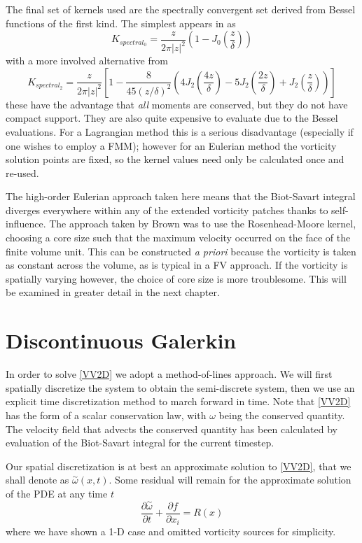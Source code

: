 \documentclass[letterpaper,12pt]{report}
\newcommand{\ben}[1]{\begin{equation}\label{#1}}
\newcommand{\ee}{\end{equation}}
\newcommand{\aomega}{\overset{\sim}{\omega}}				%
\begin{document}
The final set of kernels used are the spectrally convergent set derived from Bessel functions of the first kind. The simplest appears in \cite{WL} as
\ben{PSkern}  K_{spectral_0}= \frac{z}{2 \pi |z|^2} (1-J_0(\frac{z}{\delta})) \ee
with a more involved alternative from \cite{HaldReview}
\ben{PSkern}  K_{spectral_2}= \frac{z}{2 \pi |z|^2} \left[1-\frac{8}{45(z/\delta)^2}(4J_2(\frac{4z}{\delta})-5J_2(\frac{2z}{\delta})+J_2(\frac{z}{\delta}))\right] \ee
these have the advantage that \textit{all} moments are conserved, but they do not have compact support. They are also quite expensive to evaluate due to the Bessel evaluations. For a Lagrangian method this is a serious disadvantage (especially if one wishes to employ a FMM); however for an Eulerian method the vorticity solution points are fixed, so the kernel values need only be calculated once and re-used.

The high-order Eulerian approach taken here means that the Biot-Savart integral diverges everywhere within any of the extended vorticity patches thanks to self-influence. The approach taken by Brown \cite{Brown2004} was to use the Rosenhead-Moore kernel, choosing a core size such that the maximum velocity occurred on the face of the finite volume unit. This can be constructed \textit{a priori} because the vorticity is taken as constant across the volume, as is typical in a FV approach. If the vorticity is spatially varying however, the choice of core size is more troublesome. This will be examined in greater detail in the next chapter.

\section{Discontinuous Galerkin}
In order to solve \eqref{VV2D} we adopt a method-of-lines approach. We will first spatially discretize the system to obtain the semi-discrete system, then we use an explicit time discretization method to march forward in time. Note that \eqref{VV2D} has the form of a scalar conservation law, with $\omega$ being the conserved quantity. The velocity field that advects the conserved quantity has been calculated by evaluation of the Biot-Savart integral for the current timestep.

Our spatial discretization is at best an approximate solution to \eqref{VV2D}, that we shall denote as $\aomega(x,t)$. Some residual will remain for the approximate solution of the PDE at any time $t$
\ben{VV2D} \frac{\partial \aomega}{\partial t} + \frac{\partial f}{\partial x_i} = R(x)\ee
where we have shown a 1-D case and omitted vorticity sources for simplicity.
\end{document}

